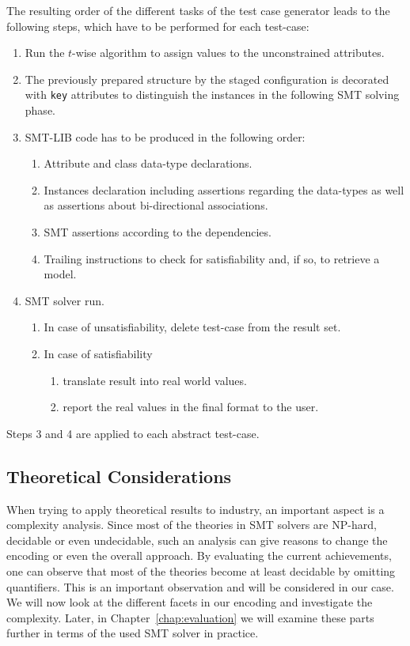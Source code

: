 The resulting order of the different tasks of the test case generator leads to the following steps, which have to be performed for each test-case:
\begin{enumerate}
 \item Run the $t$-wise algorithm to assign values to the unconstrained attributes.
 \item The previously prepared structure by the staged configuration is decorated with \verb|key| attributes to distinguish the instances in the following SMT solving phase.
 \item SMT-LIB code has to be produced in the following order:
  \begin{enumerate}
   \item Attribute and class data-type declarations.
   \item Instances declaration including assertions regarding the data-types as well as assertions about bi-directional associations.
   \item SMT assertions according to the dependencies.
   \item Trailing instructions to check for satisfiability and, if so, to retrieve a model.
  \end{enumerate}
 \item SMT solver run. 
 	\begin{enumerate}
 	 \item In case of unsatisfiability, delete test-case from the result set.
 	 \item In case of satisfiability
 	 \begin{enumerate}
 	  \item translate result into real world values.
 	  \item report the real values in the final format to the user.
 	 \end{enumerate}
 	\end{enumerate}
\end{enumerate}

Steps 3 and 4 are applied to each abstract test-case.

\subsection{Theoretical Considerations}\label{subsec:theor-eval}

When trying to apply theoretical results to industry, an important aspect is a complexity analysis. Since most of the theories in SMT solvers are NP-hard, decidable or even undecidable, such an analysis can give reasons to change the encoding or even the overall approach. By evaluating the current achievements, one can observe that most of the theories become at least decidable by omitting quantifiers. This is an important observation and will be considered in our case.
We will now look at the different facets in our encoding and investigate the complexity. Later, in Chapter~\ref{chap:evaluation} we will examine these parts further in terms of the used SMT solver in practice.


